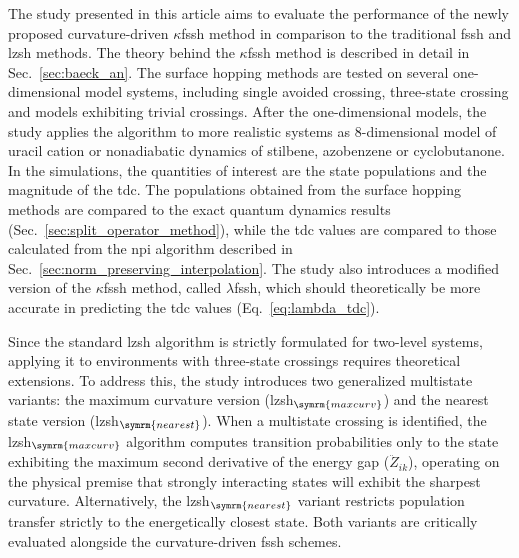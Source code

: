 The study presented in this article aims to evaluate the performance of the newly proposed curvature-driven $\kappa$\acrshort{fssh} method in comparison to the traditional \acrshort{fssh} and \acrshort{lzsh} methods. The theory behind the $\kappa$\acrshort{fssh} method is described in detail in Sec.~\ref{sec:baeck_an}. The surface hopping methods are tested on several one-dimensional model systems, including single avoided crossing, three-state crossing and models exhibiting trivial crossings. After the one-dimensional models, the study applies the algorithm to more realistic systems as 8-dimensional model of uracil cation or nonadiabatic dynamics of stilbene, azobenzene or cyclobutanone. In the simulations, the quantities of interest are the state populations and the magnitude of the \acrshort{tdc}. The populations obtained from the surface hopping methods are compared to the exact quantum dynamics results (Sec.~\ref{sec:split_operator_method}), while the \acrshort{tdc} values are compared to those calculated from the \acrfull{npi} algorithm described in Sec.~\ref{sec:norm_preserving_interpolation}. The study also introduces a modified version of the $\kappa$\acrshort{fssh} method, called $\lambda$\acrshort{fssh}, which should theoretically be more accurate in predicting the \acrshort{tdc} values (Eq.~\eqref{eq:lambda_tdc}).

Since the standard \acrshort{lzsh} algorithm is strictly formulated for two-level systems, applying it to environments with three-state crossings requires theoretical extensions. To address this, the study introduces two generalized multistate variants: the maximum curvature version (\acrshort{lzsh}$_{\symrm{maxcurv}}$) and the nearest state version (\acrshort{lzsh}$_{\symrm{nearest}}$). When a multistate crossing is identified, the \acrshort{lzsh}$_{\symrm{maxcurv}}$ algorithm computes transition probabilities only to the state exhibiting the maximum second derivative of the energy gap ($\ddot{Z}_{ik}$), operating on the physical premise that strongly interacting states will exhibit the sharpest curvature. Alternatively, the \acrshort{lzsh}$_{\symrm{nearest}}$ variant restricts population transfer strictly to the energetically closest state. Both variants are critically evaluated alongside the curvature-driven \acrshort{fssh} schemes.
